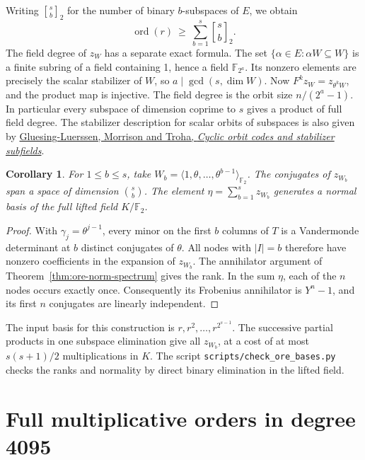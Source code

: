 \documentclass[11pt]{article}
\newtheorem{corollary}[theorem]{Corollary}
\newcommand{\F}{\mathbb F_2}
\newcommand{\ord}{\operatorname{ord}}
\begin{document}
Writing \({s\brack b}_2\) for the number of binary \(b\)-subspaces
of \(E\), we obtain
\[
 \ord(r)\ \ge\ \sum_{b=1}^s {s\brack b}_2 .
\]
The field degree of \(z_W\) has a separate exact formula. The set
\(\{\alpha\in E:\alpha W\subseteq W\}\) is a finite subring of a
field containing 1, hence a field \(\mathbb F_{2^a}\). Its nonzero
elements are precisely the scalar stabilizer of \(W\), so
\(a\mid\gcd(s,\dim W)\). Now \(F^k z_W=z_{\theta^kW}\), and the
product map is injective. The field degree is the orbit size
\(n/(2^a-1)\). In particular every subspace of dimension coprime
to \(s\) gives a product of full field degree. The stabilizer
description for scalar orbits of subspaces is also given by
\href{https://arxiv.org/abs/1403.1218}{Gluesing-Luerssen, Morrison
and Troha, \emph{Cyclic orbit codes and stabilizer subfields}}.

\begin{corollary}\label{cor:ore-normal-flag}
For \(1\le b\le s\), take \(W_b=\langle1,\theta,\ldots,\theta^{b-1}\rangle_{\F}\).
The conjugates of \(z_{W_b}\) span a space of dimension \(\binom{s}{b}\).
The element \(\eta=\sum_{b=1}^s z_{W_b}\) generates a normal basis
of the full lifted field \(K/\F\).
\end{corollary}
\begin{proof}
With \(\gamma_j=\theta^{j-1}\), every minor on the first \(b\) columns
of \(T\) is a Vandermonde determinant at \(b\) distinct conjugates
of \(\theta\). All nodes with \(|I|=b\) therefore have nonzero
coefficients in the expansion of \(z_{W_b}\). The annihilator
argument of Theorem~\ref{thm:ore-norm-spectrum} gives the rank.
In the sum \(\eta\), each of the \(n\) nodes occurs exactly once.
Consequently its Frobenius annihilator is \(Y^n-1\), and its first
\(n\) conjugates are linearly independent.
\end{proof}

The input basis for this construction is \(r,r^2,\ldots,r^{2^{s-1}}\).
The successive partial products in one subspace elimination give
all \(z_{W_b}\), at a cost of at most \(s(s+1)/2\) multiplications
in \(K\). The script \nolinkurl{scripts/check_ore_bases.py} checks the
ranks and normality by direct binary elimination in the lifted field.


\section{Full multiplicative orders in degree 4095}\label{sec:ore4095}
\end{document}
